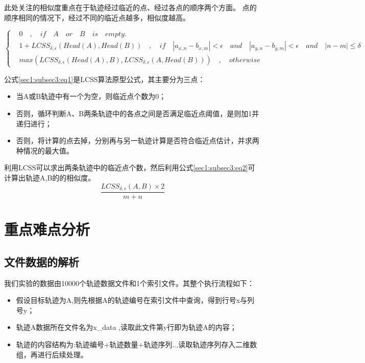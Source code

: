 \documentclass[UTF8]{ctexart}
\begin{document}
此处关注的相似度重点在于轨迹经过临近的点、经过各点的顺序两个方面。
点的顺序相同的情况下，经过不同的临近点越多，相似度越高。

\begin{equation}
\label{sec1:subsec3:eq1}
\left\{
\begin{aligned}
& 0 \quad , \quad if \quad A \quad or \quad B \quad is \quad empty. \\
& 1+LCSS_{\delta,\epsilon}(Head(A),Head(B))\quad , \quad if \quad |a_{x,n}-b_{x,m}|<\epsilon \quad and \quad |a_{y,n}-b_{y,m}|<\epsilon \quad and \quad |n-m|\leq \delta \\
& max(LCSS_{\delta,\epsilon}(Head(A),B),LCSS_{\delta,\epsilon}(A,Head(B))) \quad , \quad otherwise
\end{aligned}
\right.
\end{equation}

公式\ref{sec1:subsec3:eq1}是LCSS算法原型公式，其主要分为三点：
\begin{itemize}
	\item 当A或B轨迹中有一个为空，则临近点个数为0；
	\item 否则，循环判断A、B两条轨迹中的各点之间是否满足临近点阈值，是则加1并递归进行；
	\item 否则，将计算的点去掉，分别再与另一轨迹计算是否符合临近点估计，并求两种情况的最大值。
\end{itemize}

利用LCSS可以求出两条轨迹中的临近点个数，然后利用公式\ref{sec1:subsec3:eq2}可计算出轨迹A,B的的相似度。
\begin{equation}
\label{sec1:subsec3:eq2}
\frac{LCSS_{\delta,\epsilon}(A,B)\times2}{m+n}
\end{equation}
\section{重点难点分析}\label{sec2}
\subsection{文件数据的解析}

我们实验的数据由10000个轨迹数据文件和1个索引文件。其整个执行流程如下：

\begin{itemize}
	\item 假设目标轨迹为A,则先根据A的轨迹编号在索引文件中查询，得到行号x与列号y；
	\item 轨迹A数据所在文件名为x\_data ,读取此文件第y行即为轨迹A的内容；
	\item 轨迹的内容结构为:轨迹编号+轨迹数量+轨迹序列..,读取轨迹序列存入二维数组，再进行后续处理。
\end{itemize}
\end{document}
